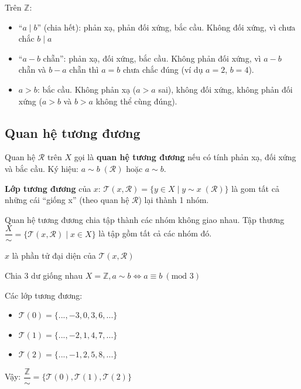 \documentclass[12pt,a4paper]{article}
\begin{document}
\begin{vidu}
  Trên $\mathbb{Z}$: 
  \begin{itemize}
  \item ``$a \mid b$'' (chia hết): phản xạ, phản đối xứng, bắc cầu. Không đối xứng, vì chưa chắc $b \mid a$
  \item ``$a - b$ chẵn'': phản xạ, đối xứng, bắc cầu. Không phản đối xứng, vì $a - b$ chẵn và $b - a$ chẵn thì $a = b$ chưa chắc đúng (ví dụ $a = 2$, $b = 4$).
  \item $a > b$: bắc cầu. Không phản xạ ($a > a$ sai), không đối xứng, không phản đối xứng ($a > b$ và $b > a$ không thể cùng đúng).
  \end{itemize}
\end{vidu}

\subsection{Quan hệ tương đương}

\begin{dinhnghia}
  Quan hệ $\mathcal{R}$ trên $X$ gọi là \textbf{quan hệ tương đương} nếu có tính phản xạ, đối xứng và bắc cầu. Ký hiệu: $a \sim b \;(\mathcal{R})$ hoặc $a \sim b$.
\end{dinhnghia}

\begin{dinhnghia}
  \textbf{Lớp tương đương} của $x$: $\mathcal{T}(x, \mathcal{R}) = \{y \in X \mid y \sim x \;(\mathcal{R})\}$ là gom tất cả những cái “giống x” (theo quan hệ $\mathcal{R}$) lại thành 1 nhóm.

  Quan hệ tương đương chia tập thành các nhóm không giao nhau. Tập thương $\dfrac{X}{\sim} = \{\mathcal{T}(x, \mathcal{R}) \mid x \in X\}$ là tập gồm tất cả các nhóm đó.

  $x$ là phần tử đại diện của $\mathcal{T}(x, \mathcal{R})$
\end{dinhnghia}

\begin{vidu}
    Chia 3 dư giống nhau $X = \mathbb{Z}, a \sim b \iff a \equiv b \ (\text{mod } 3)$
    
    Các lớp tương đương:
    \begin{itemize}
        \item $\mathcal{T}(0) = \{..., -3, 0, 3, 6, ...\}$
        \item $\mathcal{T}(1) = \{..., -2, 1, 4, 7, ...\}$
        \item $\mathcal{T}(2) = \{..., -1, 2, 5, 8, ...\}$
    \end{itemize}

    Vậy: $\dfrac{\mathbb{Z}}{\sim} = \{\mathcal{T}(0), \mathcal{T}(1), \mathcal{T}(2)\}$
\end{vidu}
\end{document}
